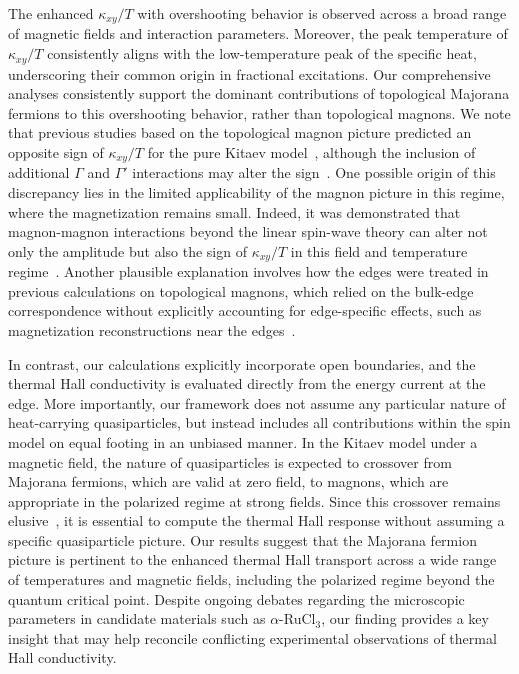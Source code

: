 \documentclass[twocolumn,superscriptaddress,showpacs, longbibliography, aps, prx]{revtex4-2}
\begin{document}
The enhanced $\kappa_{xy}/T$ with overshooting behavior is observed across a broad range of magnetic fields and interaction parameters. 
Moreover, the peak temperature of $\kappa_{xy}/T$ consistently aligns with the low-temperature peak of the specific heat, underscoring their common origin in fractional excitations. 
Our comprehensive analyses consistently support the dominant contributions of topological Majorana fermions to this overshooting behavior, rather than topological magnons. 
We note that previous studies based on the topological magnon picture predicted an opposite sign of $\kappa_{xy}/T$ for the pure Kitaev model~\cite{McClartyDGRPMP2018,Koyama2024}, although the inclusion of additional $\Gamma$ and $\Gamma'$ interactions may alter the sign~\cite{ChernZK2021,ZhangCK2021}. 
One possible origin of this discrepancy lies in the limited applicability of the magnon picture in this regime, where the magnetization remains small. 
Indeed, it was demonstrated that magnon-magnon interactions beyond the linear spin-wave theory can alter not only the amplitude but also the sign of $\kappa_{xy}/T$ in this field and temperature regime~\cite{Koyama2024}. 
Another plausible explanation involves how the edges were treated in previous calculations on topological magnons, which relied on the bulk-edge correspondence without explicitly accounting for edge-specific effects, such as magnetization reconstructions near the edges~\cite{KoyamaN2023,HabelMWK2024}. 

In contrast, our calculations explicitly incorporate open boundaries, and the thermal Hall conductivity is evaluated directly from the energy current at the edge. 
More importantly, our framework does not assume any particular nature of heat-carrying quasiparticles, but instead includes all contributions within the spin model on equal footing in an unbiased manner. 
In the Kitaev model under a magnetic field, the nature of quasiparticles is expected to crossover from Majorana fermions, which are valid at zero field, to magnons, which are appropriate in the polarized regime at strong fields. 
Since this crossover remains elusive~\cite{WinterRMCHV2017,YoshitakeNKM2020}, it is essential to compute the thermal Hall response without assuming a specific quasiparticle picture. 
Our results suggest that the Majorana fermion picture is pertinent to the enhanced thermal Hall transport across a wide range of temperatures and magnetic fields, including the polarized regime beyond the quantum critical point. 
Despite ongoing debates regarding the microscopic parameters in candidate materials such as $\alpha$-RuCl$_3$, our finding provides a key insight that may help reconcile conflicting experimental observations of thermal Hall conductivity. 
\end{document}
